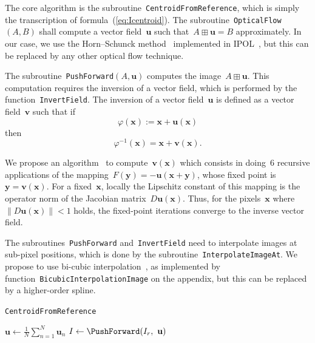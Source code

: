 \documentclass{ipol}
\def\x{\mathbf{x}}
\def\y{\mathbf{y}}
\def\u{\mathbf{u}}
\def\v{\mathbf{v}}
\begin{document}
The core algorithm is the subroutine~\texttt{CentroidFromReference}, which is
simply the transcription of formula~(\ref{eq:Icentroid}).
The subroutine~\texttt{OpticalFlow}$(A,B)$ shall compute a vector field~$\u$
such that~$A\boxplus\u=B$ approximately.  In our case, we use the
Horn--Schunck method~\cite{horn1981determining} implemented in
IPOL~\cite{HSipol}, but this can be replaced by any other optical flow
technique.

The subroutine~\texttt{PushForward}$(A,\u)$ computes the image~$A\boxplus\u$.
This computation requires the inversion of a vector field, which is
performed by the function~\texttt{InvertField}.  The inversion of a vector
field~$\u$ is defined as a vector field~$\v$ such that if
\[
\varphi(\x):=\x+\u(\x)
\]
then
\[
\varphi^{-1}(\x)=\x+\v(\x).
\]
\par
We propose an algorithm~\cite{chen2008} to compute~$\v(\x)$ which
consists in doing~$6$
recursive applications of the mapping~$F(\y)=-\u(\x+\y)$, whose fixed point
is~$\y=\v(\x)$.
For a fixed~$\x$,  locally the Lipschitz constant of this mapping is the operator norm of
the Jacobian matrix~$D\u(\x)$.
Thus, for the pixels~$\x$ where~$\|D\u(\x)\|<1$ holds,
%
the fixed-point iterations converge to the inverse vector field.

The subroutines~\texttt{PushForward} and~\texttt{InvertField} need to
interpolate images at sub-pixel positions, which is done by the
subroutine~\texttt{InterpolateImageAt}.  We propose to use bi-cubic
interpolation~\cite{keys1981cubic}, as implemented by
function~\texttt{BicubicInterpolationImage} on the appendix, but this can be
replaced by a higher-order spline.

\begin{algorithm}[H]
	\caption{\texttt{CentroidFromReference}}
	\label{alg:centroid}
	\dontprintsemicolon

	\BlankLine
	\For{$n=1,\ldots,N$}{
		$\u_n\leftarrow\OpticalFlow(I_r,\ I_n)$\;
	}
	\BlankLine
	$\u\leftarrow\displaystyle\frac{1}{N}\sum_{n=1}^N\u_n$\;
	\BlankLine
	$I\leftarrow\PushForward(I_r,\ \u)$\;
\end{algorithm}
\end{document}
